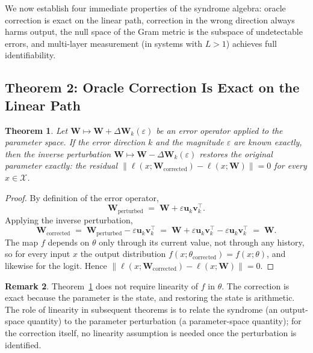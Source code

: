 \documentclass[11pt,a4paper]{article}
\newtheorem{theorem}{Theorem}[section]
\theoremstyle{definition}
\newtheorem{remark}[theorem]{Remark}
\newcommand{\Wm}{\mathbf{W}}
\newcommand{\vk}[1][]{\mathbf{v}_{#1}}
\newcommand{\uk}[1][]{\mathbf{u}_{#1}}
\newcommand{\norm}[1]{\left\lVert#1\right\rVert}
\begin{document}
We now establish four immediate properties of the syndrome algebra: oracle correction is exact on the linear path, correction in the wrong direction always harms output, the null space of the Gram metric is the subspace of undetectable errors, and multi-layer measurement (in systems with $L>1$) achieves full identifiability.

\subsection{Theorem 2: Oracle Correction Is Exact on the Linear Path}
\label{sec:oracle}

\begin{thmbox}
\begin{theorem}
\label{thm:oracle}
Let $\Wm \mapsto \Wm + \Delta\Wm_k(\varepsilon)$ be an error operator applied to the parameter space. If the error direction $k$ and the magnitude $\varepsilon$ are known exactly, then the inverse perturbation $\Wm\mapsto\Wm - \Delta\Wm_k(\varepsilon)$ restores the original parameter exactly: the residual $\norm{\ell(x;\Wm_{\mathrm{corrected}}) - \ell(x;\Wm)} = 0$ for every $x\in\mathcal{X}$.
\end{theorem}
\end{thmbox}

\begin{proof}
By definition of the error operator,
\[
  \Wm_{\mathrm{perturbed}} \;=\; \Wm + \varepsilon\uk[k]\vk[k]^\top.
\]
Applying the inverse perturbation,
\[
  \Wm_{\mathrm{corrected}}
  \;=\; \Wm_{\mathrm{perturbed}} - \varepsilon\uk[k]\vk[k]^\top
  \;=\; \Wm + \varepsilon\uk[k]\vk[k]^\top - \varepsilon\uk[k]\vk[k]^\top
  \;=\; \Wm.
\]
The map $f$ depends on $\theta$ only through its current value, not through any history, so for every input $x$ the output distribution $f(x;\theta_{\mathrm{corrected}}) = f(x;\theta)$, and likewise for the logit. Hence $\norm{\ell(x;\Wm_{\mathrm{corrected}}) - \ell(x;\Wm)} = 0$.
\end{proof}

\begin{remark}
\label{rmk:no_linearity}
Theorem~\ref{thm:oracle} does not require linearity of $f$ in $\theta$. The correction is exact because the parameter is the state, and restoring the state is arithmetic. The role of linearity in subsequent theorems is to relate the syndrome (an output-space quantity) to the parameter perturbation (a parameter-space quantity); for the correction itself, no linearity assumption is needed once the perturbation is identified.
\end{remark}
\end{document}
